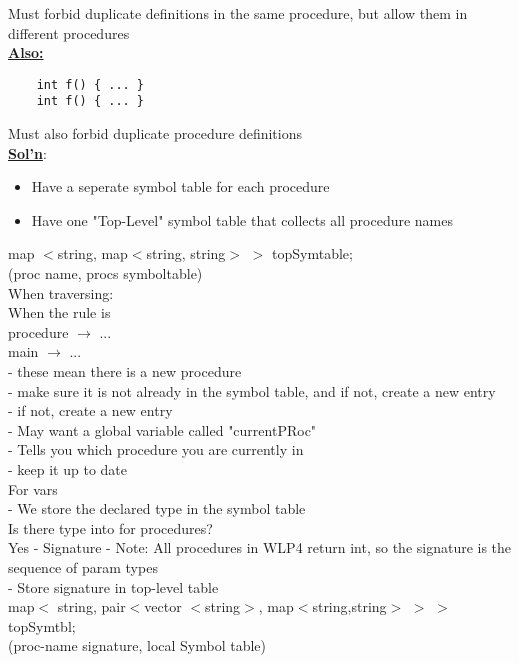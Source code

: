\documentclass[12pt]{article}
\newcommand{\myt}[1]{\textbf{\underline{#1}}}
\begin{document}
	Must forbid duplicate definitions in the same procedure, but allow them in different procedures\\
	
	\myt{Also:} \\
	\begin{verbatim}
	int f() { ... }
	int f() { ... }
	\end{verbatim}
	
	Must also forbid duplicate procedure definitions\\
	
	\myt{Sol'n}:\\
	\begin{itemize}
		\item Have a seperate symbol table for each procedure
		\item Have one "Top-Level" symbol table that collects all procedure names
	\end{itemize}
	
	map $<$string, map$<$string, string$>$ $>$ topSymtable;\\
	(proc name, procs symboltable)\\
	When traversing:\\
	When the rule is \\
	procedure $\rightarrow$ ...\\
	main $\rightarrow$ ...\\
	- these mean there is a new procedure\\
	- make sure it is not already in the symbol table, and if not, create a new entry\\
	- if not, create a new entry\\
	- May want a global variable called "currentPRoc"\\
	- Tells you which procedure you are currently in\\
	- keep it up to date\\
	
	For vars\\
	- We store the declared type in the symbol table\\
	Is there type into for procedures?\\
	Yes - Signature
	- Note: All procedures in WLP4 return int, so the signature is the sequence of param types\\
	- Store signature in top-level table\\
	
	map$<$ string, pair$<$vector $<$string$>$, map$<$string,string$>$ $>$ $>$ topSymtbl;\\
	(proc-name signature, local Symbol table)\\
	
\end{document}
